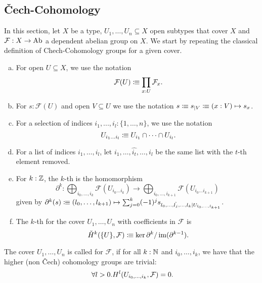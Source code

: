 \subsection{Čech-Cohomology}

In this section, let $X$ be a type, $U_1,\dots,U_n\subseteq X$ open subtypes that cover $X$
and $\mathcal F:X\to \operatorname{Ab}$ a dependent abelian group on $X$.
We start by repeating the classical definition of Chech-Cohomology groups for a given cover.

\begin{definition}%
  \label{chech-complex}
  \begin{enumerate}[(a)]
  \item {} For open $U\subseteq X$, we use the notation
    \[
      \mathcal F(U)\colonequiv \prod_{x:U}\mathcal F_x\rlap{.}
    \]
  \item For $s:\mathcal F(U)$ and open $V\subseteq U$ we use the notation $s\vcentcolon\mspace{-1.2mu}\equiv s_{|V} \vcentcolon\mspace{-1.2mu}\equiv (x:V)\mapsto s_x$.
  \item {}For a selection of indices $i_1,...,i_l:\{1,\dots,n\}$, we use the notation
    \[
      U_{i_1\dots i_l}\colonequiv U_{i_1}\cap\dots\cap U_{i_l}\rlap{.}
    \]
  \item For a list of indices $i_1,\dots,i_l$, let $i_1,\dots,\hat{i_t},\dots,i_l$ be the same list with the $t$-th element removed.
  \item For $k:\mathbb{Z}$, the $k$-th  is the homomorphism
    \[
      \partial^k:\bigoplus_{i_0,\dots,i_k}\mathcal F(U_{i_0\dots i_k})\to \bigoplus_{i_0,\dots,i_{k+1}}\mathcal F(U_{i_0\dots i_{k+1}})
    \]
    given by $\partial^k(s)\vcentcolon\mspace{-1.2mu}\equiv (l_0,\dots,l_{k+1}) \mapsto \sum_{j=0}^k (-1)^j s_{l_0,\dots,\hat{l_j},\dots,l_k|U_{l_0,\dots,l_{k+1}}}$.
  \item The $k$-th  for the cover $U_1,\dots,U_n$ with coefficients in $\mathcal F$ is
    \[
      \check{H}^k(\{U\},\mathcal F)\colonequiv \ker\partial^{k} / \im(\partial^{k-1})\rlap{.}
    \]
  \end{enumerate}
\end{definition}

\begin{definition}
  The cover $U_1,\dots,U_n$ is called  for $\mathcal F$,
  if for all $k:\mathbb{N}$ and $i_0,\dots,i_k$, we have that the higher (non Čech) cohomology groups are trivial:
  \[
    \forall l>0. H^l(U_{i_0,\dots,i_k},\mathcal F)=0\rlap{.}
  \]
\end{definition}


